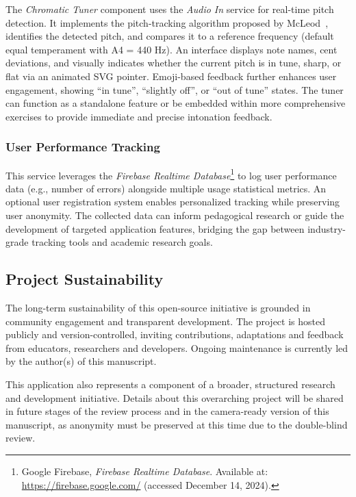 \documentclass[runningheads]{llncs}
\begin{document}
The \textit{Chromatic Tuner} component uses the \textit{Audio In} service for real-time pitch detection. It implements the pitch-tracking algorithm proposed by McLeod~\cite{McLeod05}, identifies the detected pitch, and compares it to a reference frequency (default equal temperament with A4 = 440 Hz). An interface displays note names, cent deviations, and visually indicates whether the current pitch is in tune, sharp, or flat via an animated SVG pointer. Emoji-based feedback further enhances user engagement, showing ``in tune”, ``slightly off”, or ``out of tune” states. The tuner can function as a standalone feature or be embedded within more comprehensive exercises to provide immediate and precise intonation feedback.


\subsubsection{User Performance Tracking}

This service leverages the \emph{Firebase Realtime Database}\footnote{Google Firebase, \textit{Firebase Realtime Database}. Available at: \url{https://firebase.google.com/} (accessed December 14, 2024).} to log user performance data (e.g., number of errors) alongside multiple usage statistical metrics. An optional user registration system enables personalized tracking while preserving user anonymity. The collected data can inform pedagogical research or guide the development of targeted application features, bridging the gap between industry-grade tracking tools and academic research goals.


\subsection{Project Sustainability}

The long-term sustainability of this open-source initiative is grounded in community engagement and transparent development. The project is hosted publicly and version-controlled, inviting contributions, adaptations and feedback from educators, researchers and developers. Ongoing maintenance is currently led by the author(s) of this manuscript.

This application also represents a component of a broader, structured research and development initiative. Details about this overarching project will be shared in future stages of the review process and in the camera-ready version of this manuscript, as anonymity must be preserved at this time due to the double-blind review.
\end{document}
